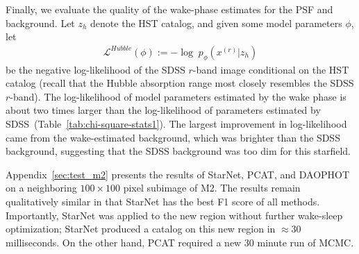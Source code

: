 Finally, we evaluate the quality of the wake-phase estimates for the PSF and background. Let $z_h$ denote the HST catalog, and given some model parameters $\phi$, let
\begin{align}
    \mathcal{L}^{Hubble}(\phi) := 
    - \log \; p_\phi(x^{(r)} | z_h)
    \label{eq:hubble_neg_loglik}
\end{align}
be the negative log-likelihood of the SDSS $r$-band image conditional on the HST catalog (recall that the Hubble absorption range most closely resembles the SDSS $r$-band).
The log-likelihood of model parameters estimated by the wake phase is about two times larger than the log-likelihood of parameters estimated by SDSS~(Table~\ref{tab:chi-square-stats1}). 
The largest improvement in log-likelihood came from the wake-estimated background, which was brighter than the SDSS background, suggesting that the SDSS background was too dim for this starfield. 



Appendix~\ref{sec:test_m2} presents the results of StarNet, PCAT, and DAOPHOT on a neighboring $100 \times 100$ pixel subimage of M2. 
The results remain qualitatively similar in that StarNet has the best F1 score of all methods. 
Importantly, StarNet was applied to the new region without further wake-sleep optimization; StarNet produced a catalog on this new region in $\approx 30$ milliseconds. 
On the other hand, PCAT required a new 30 minute run of MCMC. 





